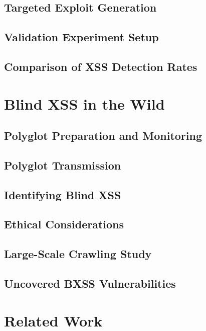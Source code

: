 \documentclass[letterpaper,twocolumn,10pt]{article}
\begin{document}
\subsection{Targeted \xss {} Exploit Generation}

\subsection{Validation Experiment Setup}

\subsection{Comparison of XSS Detection Rates}

\section{Blind XSS in the Wild}

\subsection{Polyglot Preparation and Monitoring}

\subsection{Polyglot Transmission}

\subsection{Identifying Blind XSS}

\subsection{Ethical Considerations}

\subsection{Large-Scale Crawling Study}

\subsection{Uncovered BXSS Vulnerabilities}

\section{Related Work}
\end{document}
